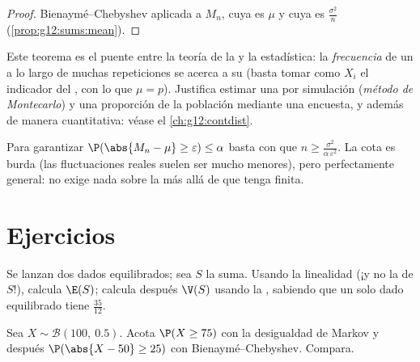 \begin{proof}
Bienaymé--Chebyshev aplicada a $M_n$, cuya  es $\mu$ y cuya
 es $\frac{\sigma^2}{n}$ (\cref{prop:g12:sums:mean}).
\end{proof}

\begin{remark}
Este teorema es el puente entre la teoría de la  y la
estadística: la \emph{frecuencia} de un  a lo largo de muchas
repeticiones  se acerca a su \emph{} (basta tomar
como $X_i$ el indicador del , con lo que $\mu = p$). Justifica
estimar una  por simulación (\emph{método de Montecarlo}) y una
proporción de la población mediante una encuesta, y además de manera
cuantitativa: véase el \cref{ch:g12:contdist}.
\end{remark}

\begin{method}\label{met:g12:sums:chebyshev}
Para garantizar $\P(\abs{M_n - \mu} \geq \varepsilon) \leq \alpha$ basta
con que $n \geq \frac{\sigma^2}{\alpha\,\varepsilon^2}$. La cota es burda
(las fluctuaciones reales suelen ser mucho menores), pero perfectamente
general: no exige nada sobre la  más allá de que tenga 
finita.
\end{method}

\section{Ejercicios}

\begin{exercise}[$\star$]\label{exo:g12:sums:1}
Se lanzan dos dados equilibrados; sea $S$ la suma. Usando la linealidad (¡y
no la  de $S$!), calcula $\E(S)$; calcula después $\V(S)$
usando la , sabiendo que un solo dado equilibrado tiene
 $\frac{35}{12}$.
\end{exercise}

\begin{exercise}[$\star$]\label{exo:g12:sums:2}
Sea $X \sim \mathcal B(100,\ 0.5)$. Acota $\P(X \geq 75)$ con la
desigualdad de Markov y después $\P(\abs{X - 50} \geq 25)$ con
Bienaymé--Chebyshev. Compara.
\end{exercise}

